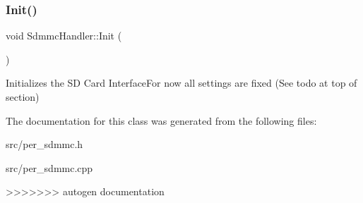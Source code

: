 \subsubsection{\texorpdfstring{Init()}{Init()}}
{\footnotesize\ttfamily void Sdmmc\+Handler\+::\+Init (\begin{DoxyParamCaption}{ }\end{DoxyParamCaption})}

Initializes the SD Card Interface\+For now all settings are fixed (See todo at top of section) 

The documentation for this class was generated from the following files\+:\begin{DoxyCompactItemize}
\item 
src/per\+\_\+sdmmc.\+h\item 
src/per\+\_\+sdmmc.\+cpp\end{DoxyCompactItemize}
>>>>>>> autogen documentation
